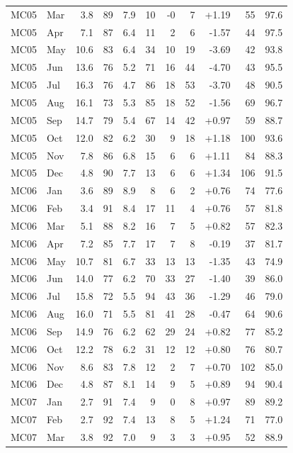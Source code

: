 \begin{longtable}{llrrrrrrrrr}
MC05 & Mar & 3.8 & 89 & 7.9 & 10 & -0 & 7 & +1.19 & 55 & 97.6 \\
MC05 & Apr & 7.1 & 87 & 6.4 & 11 & 2 & 6 & -1.57 & 44 & 97.5 \\
MC05 & May & 10.6 & 83 & 6.4 & 34 & 10 & 19 & -3.69 & 42 & 93.8 \\
MC05 & Jun & 13.6 & 76 & 5.2 & 71 & 16 & 44 & -4.70 & 43 & 95.5 \\
MC05 & Jul & 16.3 & 76 & 4.7 & 86 & 18 & 53 & -3.70 & 48 & 90.5 \\
MC05 & Aug & 16.1 & 73 & 5.3 & 85 & 18 & 52 & -1.56 & 69 & 96.7 \\
MC05 & Sep & 14.7 & 79 & 5.4 & 67 & 14 & 42 & +0.97 & 59 & 88.7 \\
MC05 & Oct & 12.0 & 82 & 6.2 & 30 & 9 & 18 & +1.18 & 100 & 93.6 \\
MC05 & Nov & 7.8 & 86 & 6.8 & 15 & 6 & 6 & +1.11 & 84 & 88.3 \\
MC05 & Dec & 4.8 & 90 & 7.7 & 13 & 6 & 6 & +1.34 & 106 & 91.5 \\
\midrule
MC06 & Jan & 3.6 & 89 & 8.9 & 8 & 6 & 2 & +0.76 & 74 & 77.6 \\
MC06 & Feb & 3.4 & 91 & 8.4 & 17 & 11 & 4 & +0.76 & 57 & 81.8 \\
MC06 & Mar & 5.1 & 88 & 8.2 & 16 & 7 & 5 & +0.82 & 57 & 82.3 \\
MC06 & Apr & 7.2 & 85 & 7.7 & 17 & 7 & 8 & -0.19 & 37 & 81.7 \\
MC06 & May & 10.7 & 81 & 6.7 & 33 & 13 & 13 & -1.35 & 43 & 74.9 \\
MC06 & Jun & 14.0 & 77 & 6.2 & 70 & 33 & 27 & -1.40 & 39 & 86.0 \\
MC06 & Jul & 15.8 & 72 & 5.5 & 94 & 43 & 36 & -1.29 & 46 & 79.0 \\
MC06 & Aug & 16.0 & 71 & 5.5 & 81 & 41 & 28 & -0.47 & 64 & 90.6 \\
MC06 & Sep & 14.9 & 76 & 6.2 & 62 & 29 & 24 & +0.82 & 77 & 85.2 \\
MC06 & Oct & 12.2 & 78 & 6.2 & 31 & 12 & 12 & +0.80 & 76 & 80.7 \\
MC06 & Nov & 8.6 & 83 & 7.8 & 12 & 2 & 7 & +0.70 & 102 & 85.0 \\
MC06 & Dec & 4.8 & 87 & 8.1 & 14 & 9 & 5 & +0.89 & 94 & 90.4 \\
\midrule
MC07 & Jan & 2.7 & 91 & 7.4 & 9 & 0 & 8 & +0.97 & 89 & 89.2 \\
MC07 & Feb & 2.7 & 92 & 7.4 & 13 & 8 & 5 & +1.24 & 71 & 77.0 \\
MC07 & Mar & 3.8 & 92 & 7.0 & 9 & 3 & 3 & +0.95 & 52 & 88.9 \\

\end{longtable}
